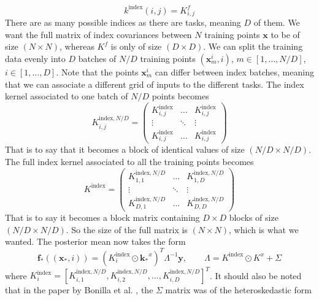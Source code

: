 \documentclass[a4paper,12pt]{article}
\begin{document}
\begin{equation}
    k^\text{index}(i, j) = K^f_{i,j}
\end{equation}
There are as many possible indices as there are tasks, meaning $D$ of them. We want the full matrix of index covariances between $N$ training points $\mathbf{x}$ to be of size $(N \times N)$, whereas $K^f$ is only of size $(D \times D)$. We can split the training data evenly into $D$ batches of $N/D$ training points $(\mathbf{x}_m^i, i)$, $m \in [1, \dots, N/D]$, $i \in [1, \dots, D]$. Note that the points $\mathbf{x}_m^i$ can differ between index batches, meaning that we can associate a different grid of inputs to the different tasks. The index kernel associated to one batch of $N/D$ points becomes
\begin{equation}
    K^{\text{index}, N/D}_{i,j} = 
    \begin{pmatrix}
        K^\text{index}_{i,j} & \dots & K^\text{index}_{i,j} \\
        \vdots & \ddots & \vdots \\
        K^\text{index}_{i,j} & \dots & K^\text{index}_{i,j}
    \end{pmatrix}
\end{equation}
That is to say that it becomes a block of identical values of size $(N/D \times N/D)$. The full index kernel associated to all the training points becomes
\begin{equation}
    K^\text{index} = \begin{pmatrix}
        K^{\text{index}, N/D}_{1,1} & \dots & K^{\text{index}, N/D}_{1,D} \\
        \vdots & \ddots & \vdots \\
        K^{\text{index}, N/D}_{D,1} & \dots & K^{\text{index}, N/D}_{D,D}
    \end{pmatrix}
\end{equation}
That is to say it becomes a block matrix containing $D \times D$ blocks of size $(N/D \times N/D)$. So the size of the full matrix is $(N \times N)$, which is what we wanted. The posterior mean now takes the form
\begin{equation}
    \mathbf{f_*}((\mathbf{x_*}, i)) = (K^\text{index}_i \odot \mathbf{k_*}^x)^T \Lambda^{-1} \mathbf{y}, \qquad \Lambda = K^\text{index} \odot K^x + \Sigma
\end{equation}
where $K^\text{index}_i = [K^{\text{index}, N/D}_{i,1}, K^{\text{index}, N/D}_{i,2}, \dots, K^{\text{index}, N/D}_{i,D}]^T$. It should also be noted that in the paper by Bonilla et al. \cite{Bonilla2007}, the $\Sigma$ matrix was of the heteroskedastic form
\end{document}

